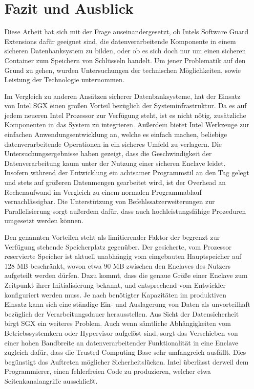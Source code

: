 
\chapter{Fazit und Ausblick}

Diese Arbeit hat sich mit der Frage auseinandergesetzt, ob Intels Software Guard Extensions dafür geeignet sind, die datenverarbeitende Komponente in einem sicheren Datenbanksystem zu bilden, oder ob es sich doch nur um einen sicheren Container zum Speichern von Schlüsseln handelt. Um jener Problematik auf den Grund zu gehen, wurden Untersuchungen der technischen Möglichkeiten, sowie Leistung der Technologie unternommen.

Im Vergleich zu anderen Ansätzen sicherer Datenbanksysteme, hat der Einsatz von Intel \ac{SGX} einen großen Vorteil bezüglich der Systeminfrastruktur. Da es auf jedem neueren Intel Prozessor zur Verfügung steht, ist es nicht nötig, zusätzliche Komponenten in das System zu integrieren. Außerdem bietet Intel Werkzeuge zur einfachen Anwendungsentwicklung an, welche es einfach machen, beliebige datenverarbeitende Operationen in ein sicheres Umfeld zu verlagern. Die Untersuchungsergebnisse haben gezeigt, dass die Geschwindigkeit der Datenverarbeitung kaum unter der Nutzung einer sicheren Enclave leidet. Insofern während der Entwicklung ein achtsamer Programmstil an den Tag gelegt und stets auf größeren Datenmengen gearbeitet wird, ist der Overhead an Rechenaufwand im Vergleich zu einem normalen Programmablauf vernachlässigbar. Die Unterstützung von Befehlssatzerweiterungen zur Parallelisierung sorgt außerdem dafür, dass auch hochleistungsfähige Prozeduren umgesetzt werden können. 

Den genannten Vorteilen steht als limitierender Faktor der begrenzt zur Verfügung stehende Speicherplatz gegenüber. Der gesicherte, vom Prozessor reservierte Speicher ist aktuell unabhängig vom eingebauten Hauptspeicher auf 128 MB beschränkt, wovon etwa 90 MB zwischen den Enclaves des Nutzers aufgeteilt werden dürfen. Dazu kommt, dass die genaue Größe einer Enclave zum Zeitpunkt ihrer Initialisierung bekannt, und entsprechend vom Entwickler konfiguriert werden muss. Je nach benötigter Kapazitäten im produktiven Einsatz kann sich eine ständige Ein- und Auslagerung von Daten als unvorteilhaft bezüglich der Verarbeitungsdauer herausstellen. Aus Sicht der Datensicherheit birgt \ac{SGX} ein weiteres Problem. Auch wenn sämtliche Abhängigkeiten vom Betriebssystemkern oder Hypervisor aufgelöst sind, sorgt das Verschieben von einer hohen Bandbreite an datenverarbeitender Funktionalität in eine Enclave zugleich dafür, dass die Trusted Computing Base sehr umfangreich ausfällt. Dies begünstigt das Auftreten möglicher Sicherheitslücken. Intel überlässt derweil dem Programmierer, einen fehlerfreien Code zu produzieren, welcher etwa Seitenkanalangriffe ausschließt.

